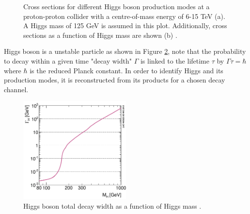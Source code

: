 \begin{figure}[H]
    \centering
    \caption{Cross sections for different Higgs boson production modes at a proton-proton collider with a centre-of-mass energy of 6-15 TeV (a). A Higgs mass of 125 GeV is assumed in this plot. Additionally, cross sections as a function of Higgs mass are shown (b) \cite{LHCHXSWG_Twiki}.}
    \label{fig:chap1:EWSB:HXSEC}
\end{figure}
Higgs boson is a unstable particle as shown in Figure \ref{fig:chap1:EWSB:D}, note that the probability to decay within a given time "decay width" $\Gamma$ is linked to the lifetime $\tau$ by $ \Gamma\tau = \hbar$ where $\hbar$ is the reduced Planck constant. In order to identify Higgs and its production modes, it is reconstructed from its products for a chosen decay channel. 
\begin{figure}[H]
    \centering
    \includegraphics[width=0.5\textwidth]{Ch1/Img/Higgs_decay.png}
    \caption{Higgs boson total decay width as a function of Higgs mass \cite{HiggsWidth}.}
    \label{fig:chap1:EWSB:D}
\end{figure}

